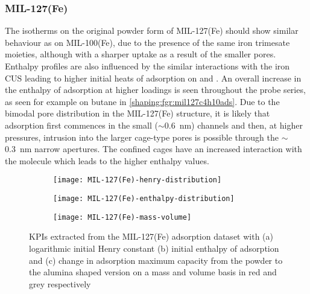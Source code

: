 
\subsubsection{MIL-127(Fe)}

The isotherms on the original powder form of MIL-127(Fe)
should show similar behaviour as on MIL-100(Fe),
due to the presence of the same iron trimesate moieties,
although with a sharper uptake as a result of the smaller pores. Enthalpy
profiles are also influenced by the similar interactions with the iron
CUS leading to higher initial heats of adsorption on  and .
An overall increase in the enthalpy of adsorption at higher loadings is seen
throughout the probe series, as seen for example on butane in
\autoref{shaping:fgr:mil127c4h10ads}.
Due to the bimodal pore distribution in the MIL-127(Fe) structure,
it is likely that adsorption first commences in the small
(\( \sim \)\SI{0.6}{\nano\metre}) channels and then, at higher pressures,
intrusion into the larger cage-type pores is possible through the
\( \sim \)\SI{0.3}{\nano\metre} narrow apertures.
The confined cages have an increased interaction with the molecule
which leads to the higher enthalpy values.

\begin{figure}[p!]
	\centering
	\begin{subfigure}{\linewidth}
		\parbox[c]{0.1\linewidth}{\caption{}%
			\label{shaping:fgr:analysismil127henry}}%
		\parbox[b]{0.8\linewidth}{%
			\texttt{[image: MIL-127(Fe)-henry-distribution]}%
		}%
	\end{subfigure}%

	\begin{subfigure}{\linewidth}
		\parbox[c]{0.1\linewidth}{\caption{}%
			\label{shaping:fgr:analysismil127enth}}%
		\parbox[b]{0.8\linewidth}{%
			\texttt{[image: MIL-127(Fe)-enthalpy-distribution]}%
		}%
	\end{subfigure}%

	\begin{subfigure}{\linewidth}
		\parbox[c]{0.1\linewidth}{\caption{}%
			\label{shaping:fgr:analysismil127basis}}%
		\parbox[b]{0.8\linewidth}{%
			\texttt{[image: MIL-127(Fe)-mass-volume]}%
		}%
	\end{subfigure}%

	\caption{KPIs extracted from the MIL-127(Fe) adsorption dataset with
		(a) logarithmic initial Henry constant (b) initial enthalpy of
        adsorption and (c) change in adsorption maximum capacity from 
        the powder to the alumina shaped version on a mass and volume 
        basis in red and grey respectively}%
	\label{shaping:fgr:analysismil127}
\end{figure}


